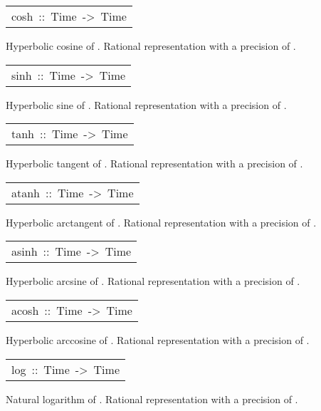 \begin{haddockdesc}
\item[\begin{tabular}{@{}l}
cosh\ ::\ Time\ ->\ Time
\end{tabular}]\haddockbegindoc
Hyperbolic cosine of . Rational representation with a
 precision of .\par


\item[\begin{tabular}{@{}l}
sinh\ ::\ Time\ ->\ Time
\end{tabular}]\haddockbegindoc
Hyperbolic sine of . Rational representation with a
 precision of .\par


\item[\begin{tabular}{@{}l}
tanh\ ::\ Time\ ->\ Time
\end{tabular}]\haddockbegindoc
Hyperbolic tangent of . Rational representation with a
 precision of .\par


\item[\begin{tabular}{@{}l}
atanh\ ::\ Time\ ->\ Time
\end{tabular}]\haddockbegindoc
Hyperbolic arctangent of . Rational representation with a
 precision of .\par


\item[\begin{tabular}{@{}l}
asinh\ ::\ Time\ ->\ Time
\end{tabular}]\haddockbegindoc
Hyperbolic arcsine of . Rational representation with a
 precision of .\par


\item[\begin{tabular}{@{}l}
acosh\ ::\ Time\ ->\ Time
\end{tabular}]\haddockbegindoc
Hyperbolic arccosine of . Rational representation with a
 precision of .\par


\item[\begin{tabular}{@{}l}
log\ ::\ Time\ ->\ Time
\end{tabular}]\haddockbegindoc
Natural logarithm of . Rational representation with a
 precision of .\par

\end{haddockdesc}